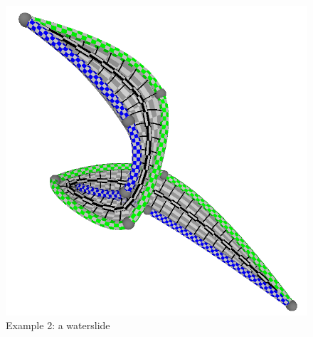 \documentclass[journal, letterpaper]{IEEEtran}
\begin{document}
\begin{figure}
	\centering
		\includegraphics[scale=0.4]{images/Result3.png}
	\caption{Example 2: a waterslide}
	\label{fig:Result3}
\end{figure}
\end{document}
